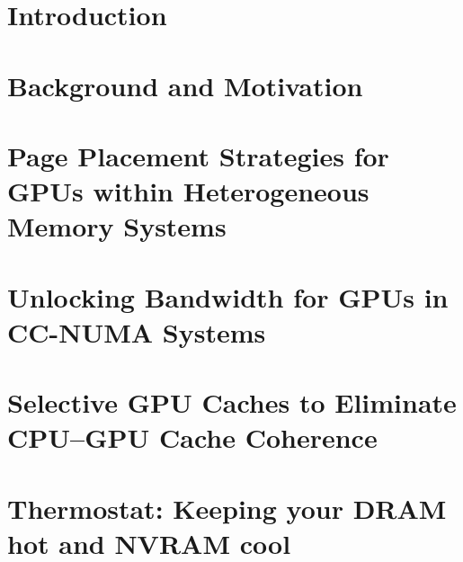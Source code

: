 \documentclass[reqno,12pt,oneside]{report} %
\theoremstyle{plain}
\theoremstyle{definition}
\theoremstyle{remark}
\numberwithin{theorem}{chapter}     %
\begin{document}
\startthechapters 

 \chapter{Introduction}
 \label{chap:intro}
 

 \chapter{Background and Motivation}
 \label{chap:background}
 

% 

 \chapter{Page Placement Strategies for GPUs within Heterogeneous
Memory Systems}
 \label{chap:asplos2015}
 

 \chapter{Unlocking Bandwidth for GPUs in CC-NUMA Systems}
 \label{chap:hpca2015}
 

 \chapter{Selective GPU Caches to Eliminate CPU--GPU Cache Coherence}
 \label{chap:hpca2016}
 

% 

 \chapter{Thermostat: Keeping your DRAM hot and NVRAM cool}
 \label{chap:thermostat}
 
\end{document}
